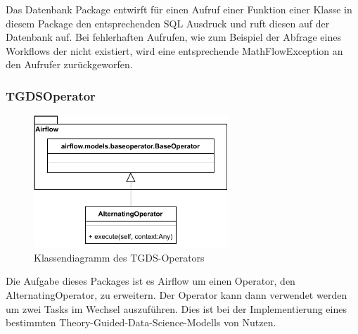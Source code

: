 \FloatBarrier
Das Datenbank Package entwirft für einen Aufruf einer Funktion einer Klasse in diesem Package den entsprechenden SQL Ausdruck und ruft diesen auf der Datenbank auf.
Bei fehlerhaften Aufrufen, wie zum Beispiel der Abfrage eines Workflows der nicht existiert, wird eine entsprechende MathFlowException an den Aufrufer zurückgeworfen.

\newpage

\subsubsection{TGDSOperator}
\begin{figure}[h!]
    \centering
    \includegraphics[width=0.65\textwidth]{res/Klassen/tgdsOp.pdf}
    \caption{Klassendiagramm des TGDS-Operators}
\end{figure}
\FloatBarrier
Die Aufgabe dieses Packages ist es Airflow um einen Operator, den AlternatingOperator, zu erweitern.
Der Operator kann dann verwendet werden um zwei Tasks im Wechsel auszuführen. 
Dies ist bei der Implementierung eines bestimmten Theory-Guided-Data-Science-Modells von Nutzen. 

\FloatBarrier
\newpage

